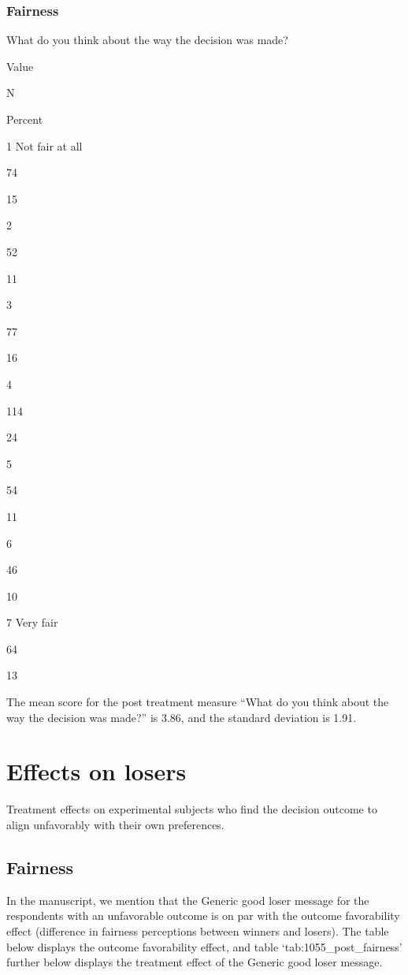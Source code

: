 \documentclass[
]{book}
\begin{document}
\hypertarget{fairness}{%
\subsection{Fairness}\label{fairness}}

What do you think about the way the decision was made?

Value

N

Percent

1 Not fair at all

74

15

2

52

11

3

77

16

4

114

24

5

54

11

6

46

10

7 Very fair

64

13

The mean score for the post treatment measure ``What do you think about
the way the decision was made?'' is 3.86, and the standard deviation is
1.91.

\hypertarget{effects-on-losers}{%
\chapter{Effects on losers}\label{effects-on-losers}}

Treatment effects on experimental subjects who find the decision outcome
to align unfavorably with their own preferences.

\hypertarget{fairness-1}{%
\section{Fairness}\label{fairness-1}}

In the manuscript, we mention that the Generic good loser message for
the respondents with an unfavorable outcome is on par with the outcome
favorability effect (difference in fairness perceptions between winners
and losers). The table below displays the outcome favorability effect,
and table `tab:1055\_post\_fairness' further below displays the
treatment effect of the Generic good loser message.
\end{document}
